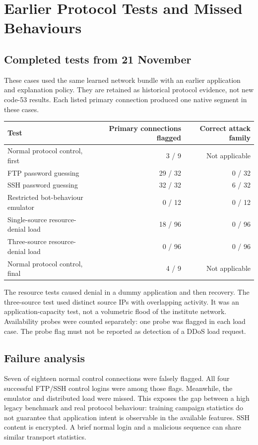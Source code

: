 \documentclass[11pt,a4paper]{article}
\newcommand{\chapterpage}[1]{\clearpage\section{#1}}
\begin{document}
\chapterpage{Earlier Protocol Tests and Missed Behaviours}
\subsection*{Completed tests from 21 November}
These cases used the same learned network bundle with an earlier application and
explanation policy. They are retained as historical protocol evidence, not new code-53
results. Each listed primary connection produced one native segment in these cases.

\begin{center}\small
\begin{tabular}{@{}lrr@{}}
\toprule Test & Primary connections flagged & Correct attack family\\\midrule
Normal protocol control, first & 3 / 9 & Not applicable\\
FTP password guessing & 29 / 32 & 0 / 32\\
SSH password guessing & 32 / 32 & 6 / 32\\
Restricted bot-behaviour emulator & 0 / 12 & 0 / 12\\
Single-source resource-denial load & 18 / 96 & 0 / 96\\
Three-source resource-denial load & 0 / 96 & 0 / 96\\
Normal protocol control, final & 4 / 9 & Not applicable\\
\bottomrule
\end{tabular}
\end{center}

The resource tests caused denial in a dummy application and then recovery. The
three-source test used distinct source IPs with overlapping activity. It was an
application-capacity test, not a volumetric flood of the institute network.
Availability probes were counted separately: one probe was flagged in each load case.
The probe flag must not be reported as detection of a DDoS load request.

\subsection*{Failure analysis}
Seven of eighteen normal control connections were falsely flagged. All four successful
FTP/SSH control logins were among those flags. Meanwhile, the emulator and distributed
load were missed. This exposes the gap between a high legacy benchmark and real protocol
behaviour: training campaign statistics do not guarantee that application intent is
observable in the available features. SSH content is encrypted. A brief normal login
and a malicious sequence can share similar transport statistics.
\end{document}
